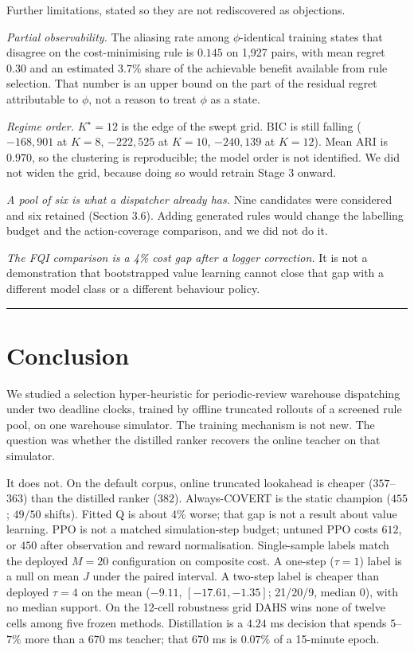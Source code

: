 \documentclass[review,3p,times]{elsarticle}
\newcounter{none}
\theoremstyle{definition}
\begin{document}
Further limitations, stated so they are not rediscovered as objections.

\emph{Partial observability.} The aliasing rate among \(\phi\)-identical
training states that disagree on the cost-minimising rule is \(0.145\)
on 1,927 pairs, with mean regret \(0.30\) and an estimated \(3.7\%\)
share of the achievable benefit available from rule selection. That
number is an upper bound on the part of the residual regret attributable
to \(\phi\), not a reason to treat \(\phi\) as a state.

\emph{Regime order.} \(K^\star=12\) is the edge of the swept grid. BIC
is still falling (\(-168{,}901\) at \(K=8\), \(-222{,}525\) at \(K=10\),
\(-240{,}139\) at \(K=12\)). Mean ARI is \(0.970\), so the clustering is
reproducible; the model order is not identified. We did not widen the
grid, because doing so would retrain Stage 3 onward.

\emph{A pool of six is what a dispatcher already has.} Nine candidates
were considered and six retained (Section 3.6). Adding generated rules
would change the labelling budget and the action-coverage comparison,
and we did not do it.

\emph{The FQI comparison is a 4\% cost gap after a logger correction.}
It is not a demonstration that bootstrapped value learning cannot close
that gap with a different model class or a different behaviour policy.

\begin{center}\rule{0.5\linewidth}{0.5pt}\end{center}

\section{Conclusion}\label{conclusion}

We studied a selection hyper-heuristic for periodic-review warehouse
dispatching under two deadline clocks, trained by offline truncated
rollouts of a screened rule pool, on one warehouse simulator. The
training mechanism is not new. The question was whether the distilled
ranker recovers the online teacher on that simulator.

It does not. On the default corpus, online truncated lookahead is
cheaper (\(357\)--\(363\)) than the distilled ranker (\(382\)).
Always-COVERT is the static champion (\(455\); \(49/50\) shifts). Fitted
Q is about 4\% worse; that gap is not a result about value learning. PPO
is not a matched simulation-step budget; untuned PPO costs \(612\), or
\(450\) after observation and reward normalisation. Single-sample labels
match the deployed \(M=20\) configuration on composite cost. A one-step
(\(\tau=1\)) label is a null on mean \(J\) under the paired interval. A
two-step label is cheaper than deployed \(\tau=4\) on the mean
(\(-9.11\), \([-17.61,-1.35]\); 21/20/9, median 0), with no median
support. On the 12-cell robustness grid DAHS wins none of twelve cells
among five frozen methods. Distillation is a \(4.24\) ms decision that
spends \(5\)--\(7\%\) more than a \(670\) ms teacher; that \(670\) ms is
\(0.07\%\) of a 15-minute epoch.
\end{document}
